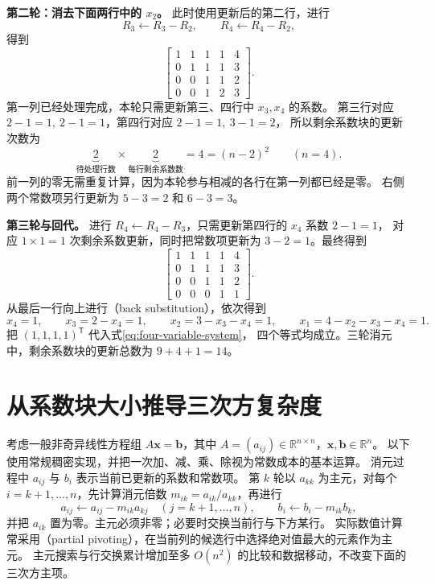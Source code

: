 \documentclass[UTF8,12pt,a4paper,fontset=fandol]{ctexart}
\begin{document}
\begin{solve}
\textbf{第二轮：消去下面两行中的 $x_2$。}
此时使用更新后的第二行，进行
\[
  R_3\leftarrow R_3-R_2,\qquad R_4\leftarrow R_4-R_2,
\]
得到
\begin{equation}
  \left[
  \begin{array}{cccc|c}
    1&1&1&1&4\\
    0&1&1&1&3\\
    0&0&\boxed{1}&\boxed{1}&2\\
    0&0&\boxed{1}&\boxed{2}&3
  \end{array}
  \right].
  \label{eq:elimination-second-round}
\end{equation}
第一列已经处理完成，本轮只需更新第三、四行中 $x_3,x_4$ 的系数。
第三行对应 $2-1=1,\ 2-1=1$，第四行对应 $2-1=1,\ 3-1=2$，
所以剩余系数块的更新次数为
\[
  \underbrace{2}_{\text{待处理行数}}
  \times\underbrace{2}_{\text{每行剩余系数数}}
  =4=(n-2)^2\qquad(n=4).
\]
前一列的零无需重复计算，因为本轮参与相减的各行在第一列都已经是零。
右侧两个常数项另行更新为 $5-3=2$ 和 $6-3=3$。

\textbf{第三轮与回代。}
进行 $R_4\leftarrow R_4-R_3$，只需更新第四行的 $x_4$ 系数 $2-1=1$，
对应 $1\times1=1$ 次剩余系数更新，同时把常数项更新为 $3-2=1$。最终得到
\begin{equation}
  \left[
  \begin{array}{cccc|c}
    1&1&1&1&4\\
    0&1&1&1&3\\
    0&0&1&1&2\\
    0&0&0&\boxed{1}&1
  \end{array}
  \right].
  \label{eq:elimination-upper-triangular}
\end{equation}
从最后一行向上进行（back substitution），依次得到
\[
  x_4=1,\qquad
  x_3=2-x_4=1,\qquad
  x_2=3-x_3-x_4=1,\qquad
  x_1=4-x_2-x_3-x_4=1.
\]
把 $(1,1,1,1)^{\mathsf T}$ 代入式\eqref{eq:four-variable-system}，
四个等式均成立。三轮消元中，剩余系数块的更新总数为 $9+4+1=14$。
\end{solve}

\section{从系数块大小推导三次方复杂度}

考虑一般非奇异线性方程组 $A\boldsymbol x=\boldsymbol b$，其中
$A=(a_{ij})\in\mathbb R^{n\times n}$，$\boldsymbol x,\boldsymbol b\in\mathbb R^n$。
以下使用常规稠密实现，并把一次加、减、乘、除视为常数成本的基本运算。
消元过程中 $a_{ij}$ 与 $b_i$ 表示当前已更新的系数和常数项。
第 $k$ 轮以 $a_{kk}$ 为主元，对每个 $i=k+1,\ldots,n$，先计算消元倍数
$m_{ik}=a_{ik}/a_{kk}$，再进行
\begin{equation}
  a_{ij}\leftarrow a_{ij}-m_{ik}a_{kj}\quad(j=k+1,\ldots,n),
  \qquad b_i\leftarrow b_i-m_{ik}b_k,
  \label{eq:general-elimination-update}
\end{equation}
并把 $a_{ik}$ 置为零。主元必须非零；必要时交换当前行与下方某行。
实际数值计算常采用（partial pivoting），在当前列的候选行中选择绝对值最大的元素作为主元。
主元搜索与行交换累计增加至多 $O(n^2)$ 的比较和数据移动，不改变下面的三次方主项。
\end{document}
